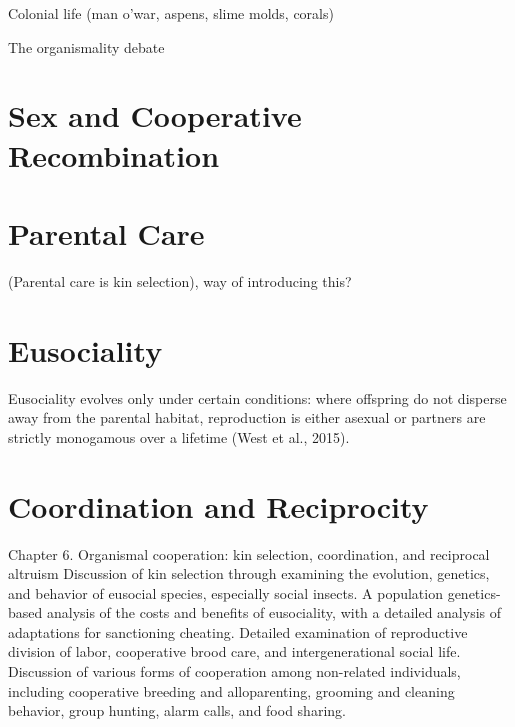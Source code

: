 \documentclass{tufte-book} %
\begin{document}
Colonial life (man o’war, aspens, slime molds, corals)

The organismality debate




\chapter{Sex and Cooperative Recombination}\label{sex}





\chapter{Parental Care}\label{parenting}


(Parental care is kin selection), way of introducing this?





\chapter{Eusociality}\label{eusociality}


Eusociality evolves only under certain conditions: where offspring do not disperse away from the parental habitat, reproduction is either asexual or partners are strictly monogamous over a lifetime (West et al., 2015). 



\chapter{Coordination and Reciprocity}\label{coord-recip}

Chapter 6. Organismal cooperation: kin selection, coordination, and reciprocal altruism
Discussion of kin selection through examining the evolution, genetics, and behavior of eusocial species, especially social insects. A population genetics-based analysis of the costs and benefits of eusociality, with a detailed analysis of adaptations for sanctioning cheating. Detailed examination of reproductive division of labor, cooperative brood care, and intergenerational social life. Discussion of various forms of cooperation among non-related individuals, including cooperative breeding and alloparenting, grooming and cleaning behavior, group hunting, alarm calls, and food sharing. 
\end{document}
